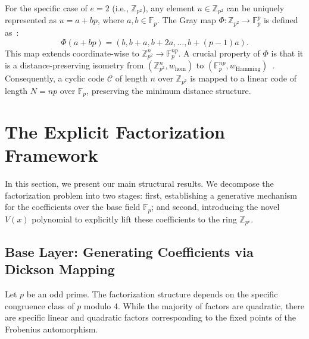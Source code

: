 \documentclass[12pt]{article}
\theoremstyle{plain}
\numberwithin{equation}{section}
\begin{document}
For the specific case of $e=2$ (i.e., $\mathbb{Z}_{p^2}$), any element $u \in \mathbb{Z}_{p^2}$ can be uniquely represented as $u = a + bp$, where $a, b \in \mathbb{F}_p$. The Gray map $\Phi: \mathbb{Z}_{p^2} \to \mathbb{F}_p^p$ is defined as~\cite{greferath1999gray}:
\begin{equation}
    \Phi(a + bp) = (b, b+a, b+2a, \dots, b+(p-1)a).
\end{equation}
This map extends coordinate-wise to $\mathbb{Z}_{p^2}^n \to \mathbb{F}_p^{np}$. 
A crucial property of $\Phi$ is that it is a distance-preserving isometry from $(\mathbb{Z}_{p^2}^n, w_{\text{hom}})$ to $(\mathbb{F}_p^{np}, w_{\text{Hamming}})$~\cite{greferath1999gray}. Consequently, a cyclic code $\mathcal{C}$ of length $n$ over $\mathbb{Z}_{p^2}$ is mapped to a linear code of length $N = np$ over $\mathbb{F}_p$, preserving the minimum distance structure.

\section{The Explicit Factorization Framework}
\label{sec:framework}

In this section, we present our main structural results. We decompose the factorization problem into two stages: first, establishing a generative mechanism for the coefficients over the base field $\mathbb{F}_p$; and second, introducing the novel $V(x)$ polynomial to explicitly lift these coefficients to the ring $\mathbb{Z}_{p^e}$.

\subsection{Base Layer: Generating Coefficients via Dickson Mapping}

Let $p$ be an odd prime. The factorization structure depends on the specific congruence class of $p$ modulo 4. While the majority of factors are quadratic, there are specific linear and quadratic factors corresponding to the fixed points of the Frobenius automorphism.
\end{document}
